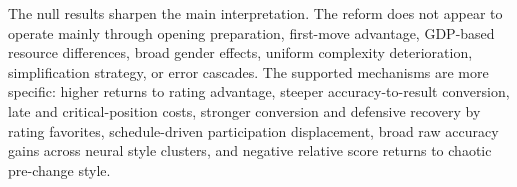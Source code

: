 The null results sharpen the main interpretation. The reform does not appear to operate mainly through opening preparation, first-move advantage, GDP-based resource differences, broad gender effects, uniform complexity deterioration, simplification strategy, or error cascades. The supported mechanisms are more specific: higher returns to rating advantage, steeper accuracy-to-result conversion, late and critical-position costs, stronger conversion and defensive recovery by rating favorites, schedule-driven participation displacement, broad raw accuracy gains across neural style clusters, and negative relative score returns to chaotic pre-change style.
